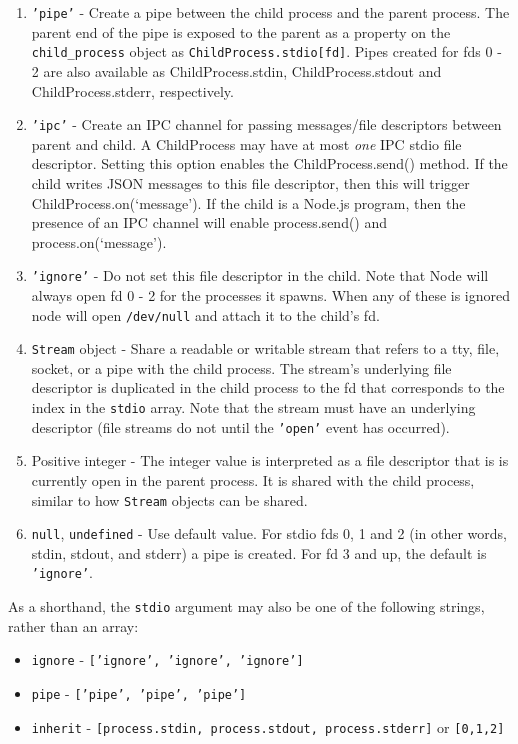 \begin{enumerate}
\def\labelenumi{\arabic{enumi}.}
\itemsep1pt\parskip0pt
\item
  \texttt{'pipe'} - Create a pipe between the child process and the
  parent process. The parent end of the pipe is exposed to the parent as
  a property on the \texttt{child\_process} object as
  \texttt{ChildProcess.stdio{[}fd{]}}. Pipes created for fds 0 - 2 are
  also available as ChildProcess.stdin, ChildProcess.stdout and
  ChildProcess.stderr, respectively.
\item
  \texttt{'ipc'} - Create an IPC channel for passing messages/file
  descriptors between parent and child. A ChildProcess may have at most
  \emph{one} IPC stdio file descriptor. Setting this option enables the
  ChildProcess.send() method. If the child writes JSON messages to this
  file descriptor, then this will trigger ChildProcess.on(`message'). If
  the child is a Node.js program, then the presence of an IPC channel
  will enable process.send() and process.on(`message').
\item
  \texttt{'ignore'} - Do not set this file descriptor in the child. Note
  that Node will always open fd 0 - 2 for the processes it spawns. When
  any of these is ignored node will open \texttt{/dev/null} and attach
  it to the child's fd.
\item
  \texttt{Stream} object - Share a readable or writable stream that
  refers to a tty, file, socket, or a pipe with the child process. The
  stream's underlying file descriptor is duplicated in the child process
  to the fd that corresponds to the index in the \texttt{stdio} array.
  Note that the stream must have an underlying descriptor (file streams
  do not until the \texttt{'open'} event has occurred).
\item
  Positive integer - The integer value is interpreted as a file
  descriptor that is is currently open in the parent process. It is
  shared with the child process, similar to how \texttt{Stream} objects
  can be shared.
\item
  \texttt{null}, \texttt{undefined} - Use default value. For stdio fds
  0, 1 and 2 (in other words, stdin, stdout, and stderr) a pipe is
  created. For fd 3 and up, the default is \texttt{'ignore'}.
\end{enumerate}

As a shorthand, the \texttt{stdio} argument may also be one of the
following strings, rather than an array:

\begin{itemize}
\itemsep1pt\parskip0pt
\item
  \texttt{ignore} - \texttt{{[}'ignore', 'ignore', 'ignore'{]}}
\item
  \texttt{pipe} - \texttt{{[}'pipe', 'pipe', 'pipe'{]}}
\item
  \texttt{inherit} -
  \texttt{{[}process.stdin, process.stdout, process.stderr{]}} or
  \texttt{{[}0,1,2{]}}
\end{itemize}

